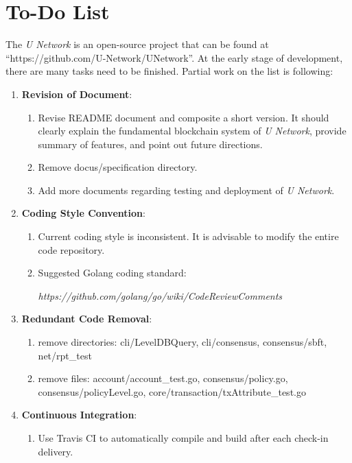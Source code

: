 \chapter{To-Do List}

The \emph{U  Network} is an open-source project that can be found at ``https://github.com/U-Network/UNetwork''. At the early stage of development, there are many tasks need to be finished. Partial work on the list is following:


\begin{enumerate}

\item {\bf Revision of Document}: 
\begin{enumerate}
\item Revise README document and composite a short version. It should clearly explain the fundamental blockchain system of  \emph{U  Network}, provide summary of features, and point out future directions. 
\item Remove docus/specification directory.
\item Add more documents regarding testing and deployment of  \emph{U  Network}.
\end{enumerate}

        

\item {\bf Coding Style Convention}: 
\begin{enumerate}
\item Current coding style is inconsistent. It is advisable to modify the entire code repository.
\item Suggested Golang coding standard: 

\textit{https://github.com/golang/go/wiki/CodeReviewComments}
\end{enumerate}

\item {\bf Redundant Code Removal}:
\begin{enumerate}
\item remove directories: cli/LevelDBQuery, cli/consensus, consensus/sbft, net/rpt\_test
\item remove files: account/account\_test.go, consensus/policy.go, consensus/policyLevel.go, core/transaction/txAttribute\_test.go
\end{enumerate}

\item {\bf Continuous Integration}:
\begin{enumerate}
\item Use Travis CI to automatically compile and build after each check-in delivery.
\end{enumerate}



\end{enumerate}
